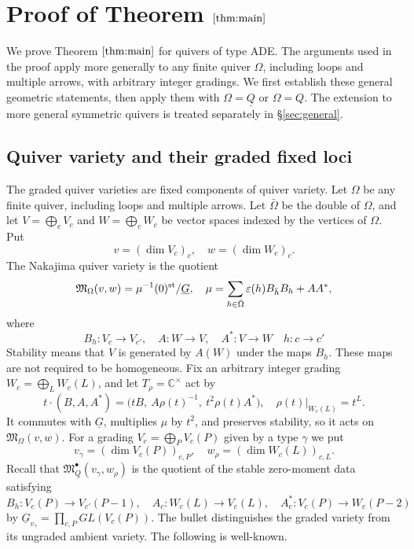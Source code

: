 \documentclass[11pt,reqno]{amsart}
\theoremstyle{definition}
\theoremstyle{remark}
\def\bbC{\mathbb C}
\def\dG{\underline G}
\def\dQ{\underline Q}
\def\M{\mathfrak M}
\begin{document}
\section{Proof of Theorem $\ref{thm:main}$}\label{sec:surj}
We prove Theorem $\ref{thm:main}$ for quivers of type ADE. 
The arguments used in the proof apply more generally to any finite quiver \(\Omega\), including loops and multiple arrows, 
with arbitrary integer gradings. We first establish these general geometric statements, 
then apply them with \(\Omega=\underline Q\) or \(\Omega=Q\).
The extension to more general symmetric quivers is treated separately in \S\ref{sec:general}.


\subsection{Quiver variety and their graded fixed loci}\label{subsec:ungraded}
The graded quiver varieties are fixed components of quiver variety.
Let $\Omega$ be any finite quiver, including loops and multiple arrows.
Let $\bar\Omega$ be the double of $\Omega$, and let
$V=\bigoplus_cV_c$ and $W=\bigoplus_cW_c$ be vector spaces indexed by
the vertices of $\Omega$. Put
\[
 v=(\dim V_c)_c,\quad
 w=(\dim W_c)_c.
\]
The Nakajima quiver variety is the quotient
\[
 \M_\Omega(v,w)
 =\mu^{-1}(0)^{\rm st}/\dG,
 \quad
\mu=\sum_{h\in\bar\Omega}
           \varepsilon(h)B_{\bar h}B_h+AA^*,
\]
where
\[
 B_h:V_c\to V_{c'},\quad
 A:W\to V,\quad A^*:V\to W
 \quad h:c\to c'
\]
Stability means that $V$ is generated by $A(W)$ under the
maps $B_h$. These maps are not required to be homogeneous.  
Fix an arbitrary integer grading $W_c=\bigoplus_LW_c(L)$, and let
$T_\rho=\bbC^\times$ act by
\[
 t\cdot(B,A,A^*)
 =\big(tB,\ A\rho(t)^{-1},\ t^2\rho(t)A^*\big),
 \quad \rho(t)|_{W_c(L)}=t^L.
\]
 It commutes with $\dG$, multiplies
$\mu$ by $t^2$, and preserves stability, so it acts on
$\M_\Omega(v,w)$. 
For a grading $V_c=\bigoplus_PV_c(P)$ given by a type $\gamma$ we put
$$v_\gamma=(\dim V_c(P))_{c,P},\quad w_\rho=(\dim W_c(L))_{c,L}.$$
Recall that $\M_{\dQ}^\bullet(v_\gamma,w_\rho)$ is the
quotient of the stable zero-moment data satisfying
\[
 B_h:V_c(P)\to V_{c'}(P-1),\quad
 A_c:W_c(L)\to V_c(L),\quad
 A^*_c:V_c(P)\to W_c(P-2)
\]
by $\dG_{v_\gamma}=\prod_{c,P}GL(V_c(P))$. The bullet distinguishes the
graded variety from its ungraded ambient variety.  
The following is well-known.
\end{document}
